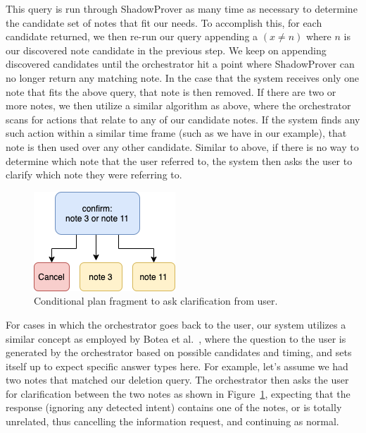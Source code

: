 This query is run through \textsf{ShadowProver} as many time as necessary to determine
the candidate set of notes that fit our needs. To accomplish this, for each candidate
returned, we then re-run our query appending a $(x \neq n)$ where $n$ is our discovered
note candidate in the previous step. We keep on appending discovered candidates until the orchestrator
hit a point where \textsf{ShadowProver} can no longer return any matching note. In the case
that the system receives only one note that fits the above query, that note is then removed.
If there are two or more notes, we then utilize a similar algorithm as above, where the
orchestrator scans for actions that relate to any of our candidate notes. If the system
finds any such action within a similar time frame (such as we have in our example), that note
is then used over any other candidate. Similar to above, if there is no way to determine
which note that the user referred to, the system then asks the user to clarify which
note they were referring to.

\begin{figure}
\centering
  \includegraphics[width=0.3\columnwidth]{chapters/06_planning/figures/intent_resolution_fragment.png}
  \caption{Conditional plan fragment to ask clarification from user.}
  \label{fig:intent_resolution_fragment}
\end{figure}

For cases in which the orchestrator goes back to the user, our system utilizes a similar concept
as employed by Botea et al.~\cite{botea_generating_2019}, where the question to the user
is generated by the orchestrator based on possible candidates and timing, and sets itself up
to expect specific answer types here. For example, let's assume we had two notes that matched
our deletion query. The orchestrator then asks the user for clarification between the two notes
as shown in Figure~\ref{fig:intent_resolution_fragment}, expecting that the response (ignoring
any detected intent) contains one of the notes, or is totally unrelated, thus cancelling the
information request, and continuing as normal.
